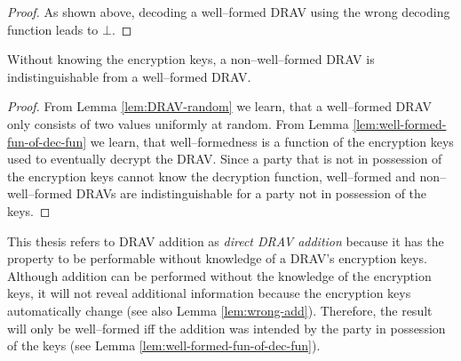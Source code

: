 \begin{proof}
  \noindent{}As shown above, decoding a well--formed DRAV using the wrong
  decoding function leads to $\bot$.

\end{proof}


\begin{lem}
  \label{lem:DRAV-indistinguishable}

  Without knowing the encryption keys, a non--well--formed DRAV is
  indistinguishable from a well--formed DRAV\@.

\end{lem}
\begin{proof}

  From Lemma \ref{lem:DRAV-random} we learn, that a well--formed DRAV only
  consists of two values uniformly at random. From Lemma
  \ref{lem:well-formed-fun-of-dec-fun} we learn, that well--formedness is a
  function of the encryption keys used to eventually decrypt the DRAV\@. Since a
  party that is not in possession of the encryption keys cannot know the
  decryption function, well--formed and non--well--formed DRAVs are
  indistinguishable for a party not in possession of the keys.

\end{proof}


\label{sec:DRAV-addition}

This thesis refers to DRAV addition as \emph{direct DRAV addition} because it
has the property to be performable without knowledge of a DRAV's encryption
keys. Although addition can be performed without the knowledge of the encryption
keys, it will not reveal additional information because the encryption keys
automatically change (see also Lemma \ref{lem:wrong-add}). Therefore, the result
will only be well--formed iff the addition was intended by the party in
possession of the keys (see Lemma \ref{lem:well-formed-fun-of-dec-fun}).

